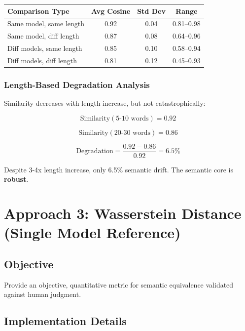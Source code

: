 \documentclass[12pt,a4paper,oneside]{report}
\begin{document}
\begin{table}[H]
\centering
\begin{tabular}{|l|c|c|c|}
\hline
\textbf{Comparison Type} & \textbf{Avg Cosine} & \textbf{Std Dev} & \textbf{Range} \\
\hline
Same model, same length & 0.92 & 0.04 & 0.81–0.98 \\
\hline
Same model, diff length & 0.87 & 0.08 & 0.64–0.96 \\
\hline
Diff models, same length & 0.85 & 0.10 & 0.58–0.94 \\
\hline
Diff models, diff length & 0.81 & 0.12 & 0.45–0.93 \\
\hline
\end{tabular}
\end{table}

\subsubsection{Length-Based Degradation Analysis}

Similarity decreases with length increase, but not catastrophically:

\begin{equation}
\text{Similarity}(\text{5-10 words}) = 0.92
\end{equation}

\begin{equation}
\text{Similarity}(\text{20-30 words}) = 0.86
\end{equation}

\begin{equation}
\text{Degradation} = \frac{0.92 - 0.86}{0.92} = 6.5\%
\end{equation}

Despite 3-4x length increase, only 6.5\% semantic drift. The semantic core is \textbf{robust}.

\section{Approach 3: Wasserstein Distance (Single Model Reference)}

\subsection{Objective}

Provide an objective, quantitative metric for semantic equivalence validated against human judgment.

\subsection{Implementation Details}
\end{document}
